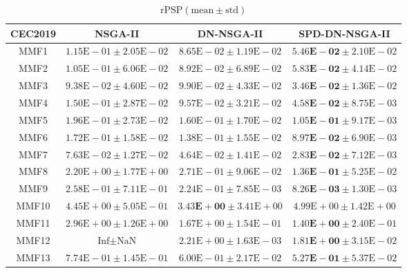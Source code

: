 \renewcommand\arraystretch{0.9}
\begin{table}[htbp]
	\scriptsize
	\centering
	\caption{$\text{rPSP} (\text{mean} \pm \text{std})$}\label{tab: rPSP}
	\begin{tabular}{cccc}
		\toprule
		CEC2019 & NSGA-II & DN-NSGA-II & SPD-DN-NSGA-II \\
		\midrule
		MMF1 & $1.15\text{E}-01 \pm 2.05\text{E}-02$ & $8.65\text{E}-02 \pm 1.19\text{E}-02$ & $\mathbf{5.46\text{E}-02} \pm 2.10\text{E}-02$\\
		MMF2 & $1.05\text{E}-01 \pm 6.06\text{E}-02$ & $8.92\text{E}-02 \pm 6.89\text{E}-02$ & $\mathbf{5.83\text{E}-02} \pm 4.14\text{E}-02$\\
		MMF3 & $9.38\text{E}-02 \pm 4.60\text{E}-02$ & $9.90\text{E}-02 \pm 4.33\text{E}-02$ & $\mathbf{3.46\text{E}-02} \pm 1.36\text{E}-02$\\
		MMF4 & $1.50\text{E}-01 \pm 2.87\text{E}-02$ & $9.57\text{E}-02 \pm 3.21\text{E}-02$ & $\mathbf{4.58\text{E}-02} \pm 8.75\text{E}-03$\\
		MMF5 & $1.96\text{E}-01 \pm 2.73\text{E}-02$ & $1.60\text{E}-01 \pm 1.70\text{E}-02$ & $\mathbf{1.05\text{E}-01} \pm 9.17\text{E}-03$\\
		MMF6 & $1.72\text{E}-01 \pm 1.58\text{E}-02$ & $1.38\text{E}-01 \pm 1.55\text{E}-02$ & $\mathbf{8.97\text{E}-02} \pm 6.90\text{E}-03$\\
		MMF7 & $7.63\text{E}-02 \pm 1.27\text{E}-02$ & $4.64\text{E}-02 \pm 1.41\text{E}-02$ & $\mathbf{2.83\text{E}-02} \pm 7.12\text{E}-03$\\ %
		MMF8 & $2.20\text{E}+00 \pm 1.77\text{E}+00$ & $2.71\text{E}-01 \pm 9.06\text{E}-02$ & $\mathbf{1.36\text{E}-01} \pm 5.25\text{E}-02$\\
		MMF9 & $2.58\text{E}-01 \pm 7.11\text{E}-01$ & $2.24\text{E}-01 \pm 7.85\text{E}-03$ & $\mathbf{8.26\text{E}-03} \pm 1.30\text{E}-03$\\
		MMF10 & $4.45\text{E}+00 \pm 5.05\text{E}-01$ & $\mathbf{3.43\text{E}+00} \pm 3.41\text{E}+00$ & $4.99\text{E}+00 \pm 1.42\text{E}+00$\\
		MMF11 & $2.96\text{E}+00 \pm 1.26\text{E}+00$ & $1.67\text{E}+00 \pm 1.54\text{E}-01$ & $\mathbf{1.40\text{E}+00} \pm 2.40\text{E}-01$\\
		MMF12 & $\text{Inf} \pm \text{NaN}$ & $2.21\text{E}+00 \pm 1.63\text{E}-03$ & $\mathbf{1.81\text{E}+00} \pm 3.15\text{E}-02$\\
		MMF13 & $7.74\text{E}-01 \pm 1.45\text{E}-01$ & $6.00\text{E}-01 \pm 2.17\text{E}-02$ & $\mathbf{5.27\text{E}-01} \pm 5.37\text{E}-02$\\

\end{tabular}
\end{table}
